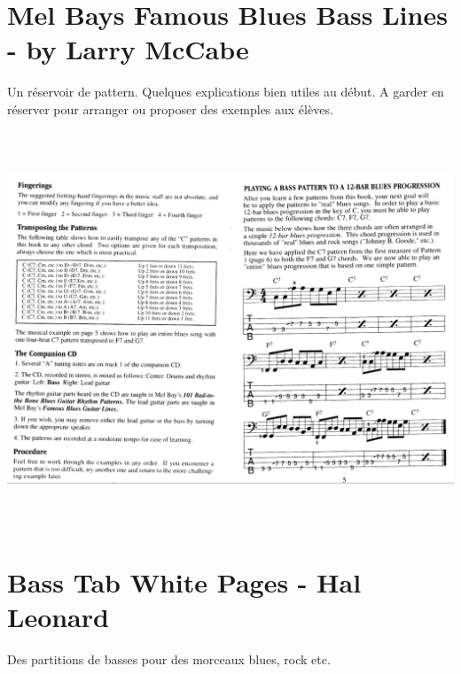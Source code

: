 \documentclass[a4paper]{book}
\begin{document}
\clearpage
\section{Mel Bay{\textquotesingle}s Famous Blues Bass Lines
- by Larry McCabe}

Un réservoir de pattern. Quelques explications bien utiles au début. A garder en réserver pour arranger ou proposer des exemples aux élèves.

\begin{center}
\includegraphics[width=17cm,height=11.823cm]{lebluessupportsmethodes-img153.png}
\end{center}
\clearpage


\section{Bass Tab White Pages - Hal Leonard}
Des partitions de basses pour des morceaux blues, rock etc.
\end{document}
